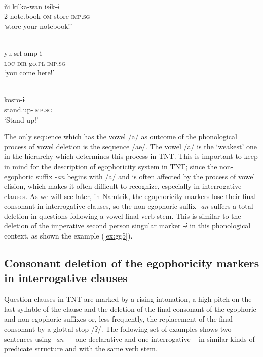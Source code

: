 \documentclass[output=paper]{langsci/langscibook}
\begin{document}
\ea \label{ex:gg3}
    \\
	\gll ñi	kilka-wan isɨk-ɨ \\
      2	note.book-\textsc{om} store-\textsc{imp.sg}\\
	\glt ‘store your notebook!’
	\z
	
\ea \label{ex:gg4}
    \\
	\gll yu-srɨ	amp-ɨ \\
      \textsc{loc-dir} go.\textsc{pl-imp.sg}\\
	\glt ‘you come here!’
	\z
	
\ea \label{ex:gg5}
    \\
	\gll kosro-ɨ\\
      stand.up-\textsc{imp.sg}\\
	\glt ‘Stand up!’
	\z
	
The only sequence which has the vowel /a/ as outcome of the phonological process of vowel deletion is the sequence /ae/. The vowel /a/ is the ‘weakest’ one in the hierarchy which determines this process in TNT. This is important to keep in mind for the description of egophoricity system in TNT; since the non-egophoric suffix -\textit{an} begins with /a/ and is often affected by the process of vowel elision, which makes it often difficult to recognize, especially in interrogative clauses. As we will see later, in Namtrik, the egophoricity markers lose their final consonant in interrogative clauses, so the non-egophoric suffix -\textit{an} suffers a total deletion in questions following a vowel-final verb stem. This is similar to the deletion of the imperative second person singular marker -\textit{ɨ} in this phonological context, as shown the example (\ref{ex:gg5}).



\subsection{Consonant deletion of the egophoricity markers in interrogative clauses}\label{s:gg1-2}

Question clauses in TNT are marked by a rising intonation, a high pitch on the last syllable of the clause and the deletion of the final consonant of the egophoric and non-egophoric suffixes or, less frequently, the replacement of the final consonant by a glottal stop /ʔ/. The following set of examples shows two sentences using -\textit{an} — one declarative and one interrogative – in similar kinds of predicate structure and with the same verb stem. 
\end{document}

